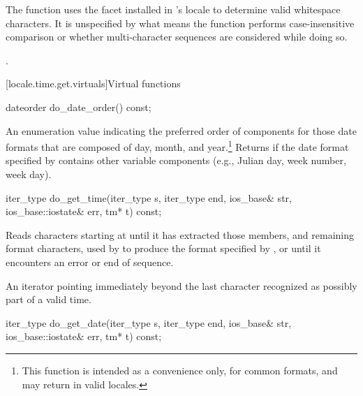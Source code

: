 \begin{itemdescr}
\pnum
\begin{note} The function uses the 
facet installed in 's locale
to determine valid whitespace characters. It is unspecified by what
means the function performs case-insensitive comparison or whether
multi-character sequences are considered while doing so. \end{note}

\pnum
\returns {}.
\end{itemdescr}

[locale.time.get.virtuals]{Virtual functions}

%
\begin{itemdecl}
dateorder do_date_order() const;
\end{itemdecl}

\begin{itemdescr}
\pnum
\returns
An enumeration value indicating the preferred order of components for
those date formats that are composed of day, month, and year.\footnote{This
function is intended as a convenience only, for common
formats, and may return
in valid locales.}
Returns
if the date format specified by
contains other variable components (e.g., Julian day, week number, week day).
\end{itemdescr}

%
\begin{itemdecl}
iter_type do_get_time(iter_type s, iter_type end, ios_base& str,
                      ios_base::iostate& err, tm* t) const;
\end{itemdecl}

\begin{itemdescr}
\pnum
\effects
Reads characters starting at 
until it has extracted those
members, and remaining format characters, used by
to produce the format specified by
,
or until it encounters an error or end of sequence.

\pnum
\returns
An iterator pointing immediately beyond the last character recognized
as possibly part of a valid time.
\end{itemdescr}

%
\begin{itemdecl}
iter_type do_get_date(iter_type s, iter_type end, ios_base& str,
                      ios_base::iostate& err, tm* t) const;
\end{itemdecl}

